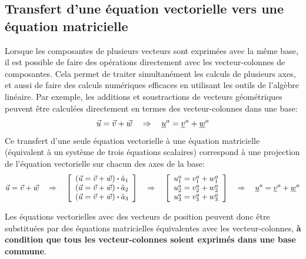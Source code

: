 \subsection{Transfert d'une équation vectorielle vers une équation matricielle} 
%
Lorsque les composantes de plusieurs vecteurs sont exprimées avec la même base, il est possible de faire des opérations directement avec les vecteur-colonnes de composantes. Cela permet de traiter simultanément les calculs de plusieurs axes, et aussi de faire des calculs numériques efficaces en utilisant les outils de l'algèbre linéaire. Par exemple, les additions et soustractions de vecteurs géométriques peuvent être calculées directement en termes des vecteur-colonnes dans une base:
\begin{equation}
\vec{u}   = \vec{v} + \vec{w}   \quad \Rightarrow \quad
\underline{u}^a = \underline{v}^a + \underline{w}^a
\end{equation} 
Ce transfert d'une seule équation vectorielle à une équation matricielle (équivalent à un système de trois équations scalaires) correspond à une projection de l'équation vectorielle sur chacun des axes de la base:
\begin{equation}
\vec{u}   = \vec{v} + \vec{w}   
\quad \Rightarrow \quad
\left[ \begin{array}{c} (\vec{u}   = \vec{v} + \vec{w}  ) \boldsymbol{\cdot} \hat{a}_1 \\ (\vec{u}   = \vec{v} + \vec{w}  ) \boldsymbol{\cdot} \hat{a}_2 \\ (\vec{u}   = \vec{v} + \vec{w}  ) \boldsymbol{\cdot} \hat{a}_3  \end{array} \right] 
\quad \Rightarrow \quad
\left[ \begin{array}{c}  u_1^a   = v_1^a + w_1^a   \\  u_2^a   = v_2^a + w_2^a   \\ u_3^a   = v_3^a + w_3^a   \end{array} \right] 
\quad \Rightarrow \quad
\underline{u}^a = \underline{v}^a + \underline{w}^a
\end{equation} 

Les équations vectorielles avec des vecteurs de position peuvent donc être substituées par des équations matricielles équivalentes avec les vecteur-colonnes,\textbf{ à condition que tous les vecteur-colonnes soient exprimés dans une base commune}. 


